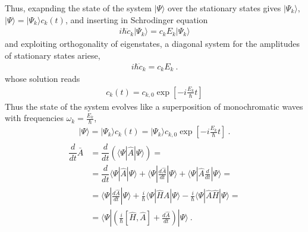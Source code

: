 \documentclass[letterpaper,10pt,english]{jupyterBook}
\begin{document}
\sphinxAtStartPar
Thus, exapnding the state of the system \(|\Psi\rangle\) over the stationary states gives \(|\Psi_k\rangle\), \(|\Psi\rangle = |\Psi_k\rangle c_k(t)\), and inserting in Schrodinger equation
\begin{equation*}
\begin{split}i \hbar \dot{c}_k |\Psi_k\rangle = c_k  E_k |\Psi_k\rangle\end{split}
\end{equation*}
\sphinxAtStartPar
and exploiting orthogonality of eigenstates, a diagonal system for the amplitudes of stationary states ariese,
\begin{equation*}
\begin{split}i \hbar \dot{c}_k = c_k E_k \ .\end{split}
\end{equation*}
\sphinxAtStartPar
whose solution reads
\begin{equation*}
\begin{split}c_k(t) = c_{k,0} \exp \left[- i \frac{E_k}{\hbar} t \right]\end{split}
\end{equation*}
\sphinxAtStartPar
Thus the state of the system evolves like a superposition of monochromatic waves with frequencies \(\omega_k = \frac{E_k}{\hbar}\),
\begin{equation*}
\begin{split}| \Psi \rangle = | \Psi_k \rangle c_k(t) = | \Psi_k \rangle c_{k,0}\exp\left[-i \frac{E_k}{\hbar} t \right] \ .\end{split}
\end{equation*}\begin{equation*}
\begin{split}\begin{aligned}
 \dfrac{d}{dt} \bar{A}
 & = \dfrac{d}{dt} \left( \langle \Psi | \hat{A} | \Psi \rangle \right) = \\
 & = \dfrac{d}{dt} \langle \Psi | \hat{A} | \Psi \rangle + \langle \Psi | \frac{d \hat{A}}{dt} | \Psi \rangle + \langle \Psi | \hat{A} \frac{d}{dt} | \Psi \rangle = \\
 & = \langle \Psi | \frac{d \hat{A}}{dt} | \Psi \rangle + \frac{i}{\hbar} \langle \Psi | \hat{H} \hat{A} | \Psi \rangle - \frac{i}{\hbar} \langle \Psi | \hat{A} \hat{H} | \Psi \rangle = \\
 & = \langle \Psi | \left( \frac{i}{\hbar} [ \hat{H}, \hat{A} ] + \frac{d \hat{A}}{dt} \right) | \Psi \rangle \ .
\end{aligned}\end{split}
\end{equation*}
\end{document}
